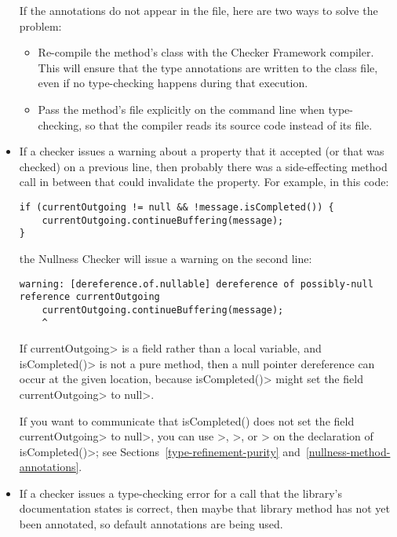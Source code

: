 \begin{itemize}
If the annotations do not appear in the  file, here are two
ways to solve the problem:
\begin{itemize}
\item
  Re-compile the method's class with the Checker Framework compiler.  This will
  ensure that the type annotations are written to the class file, even if
  no type-checking happens during that execution.
\item
  Pass the method's file explicitly on the command line when type-checking,
  so that the compiler reads its source code instead of its 
  file.
\end{itemize}

\item
If a checker issues a warning about a property that it accepted (or that
was checked) on a previous line, then probably there was a side-effecting
method call in between that could invalidate the property.  For example, in
this code:

\begin{Verbatim}
if (currentOutgoing != null && !message.isCompleted()) {
    currentOutgoing.continueBuffering(message);
}
\end{Verbatim}

\noindent
the Nullness Checker will issue a warning on the second line:
\begin{Verbatim}
warning: [dereference.of.nullable] dereference of possibly-null reference currentOutgoing
    currentOutgoing.continueBuffering(message);
    ^
\end{Verbatim}

If \<currentOutgoing> is a field rather than a local variable, and
\<isCompleted()> is not a pure method, then a null pointer
dereference can occur at the given location, because \<isCompleted()> might set
the field \<currentOutgoing> to \<null>.

If you want to communicate that
isCompleted() does not set the field \<currentOutgoing> to \<null>, you can use
\<>,
\<>,
or \<> on the
declaration of \<isCompleted()>; see Sections~\ref{type-refinement-purity}
and~\ref{nullness-method-annotations}.


\item
If a checker issues a type-checking error for a call that the library's
documentation states is correct, then maybe that library method has not yet
been annotated, so default annotations are being used.


\end{itemize}

